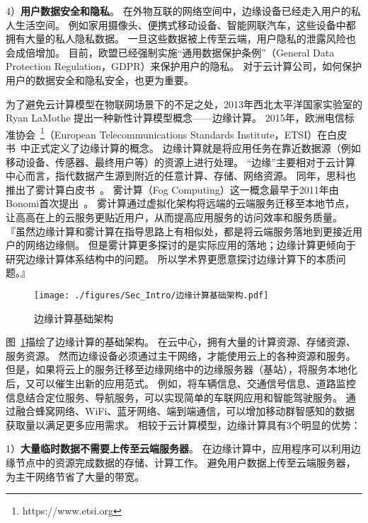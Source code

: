 4）\textbf{用户数据安全和隐私}。
在外物互联的网络空间中，边缘设备已经走入用户的私人生活空间。
例如家用摄像头、便携式移动设备、智能网联汽车，这些设备中都拥有大量的私人隐私数据。
一旦这些数据被上传至云端，用户隐私的泄露风险也会成倍增加。
目前，欧盟已经强制实施“通用数据保护条例”（General Data Protection Regulation，GDPR）来保护用户的隐私。
对于云计算公司，如何保护用户的数据安全和隐私安全，也更为重要。

为了避免云计算模型在物联网场景下的不足之处，2013年西北太平洋国家实验室的 Ryan LaMothe 提出一种新性计算模型概念——边缘计算。
2015年，欧洲电信标准协会~\footnote{https://www.etsi.org}（European Telecommunications Standards Institute，ETSI）在白皮书~\cite{hu2015mobile}中正式定义了边缘计算的概念。
边缘计算就是将应用任务在靠近数据源（例如移动设备、传感器、最终用户等）的资源上进行处理。
“边缘”主要相对于云计算中心而言，指代数据产生源到附近的任意计算、存储、网络资源。
同年，思科也推出了雾计算白皮书~\cite{computing2015internet}。
雾计算（Fog Computing）这一概念最早于2011年由Bonomi首次提出~\cite{bonomi2011connected}。
雾计算通过虚拟化架构将远端的云端服务迁移至本地节点，让高高在上的云服务更贴近用户，从而提高应用服务的访问效率和服务质量。
『虽然边缘计算和雾计算在指导思路上有相似处，都是将云端服务落地到更接近用户的网络边缘侧。
但是雾计算更多探讨的是实际应用的落地；边缘计算更倾向于研究边缘计算体系结构中的问题。
所以学术界更愿意探讨边缘计算下的本质问题。』

\begin{figure}[!h]
  \centering
  \texttt{[image: ./figures/Sec\_Intro/边缘计算基础架构.pdf]}
  \vspace{-0.5em}
  \caption{边缘计算基础架构}
  \label{Figure_EC_Architecture}
\end{figure}

图~\ref{Figure_EC_Architecture}描绘了边缘计算的基础架构。
在云中心，拥有大量的计算资源、存储资源、服务资源。
然而边缘设备必须通过主干网络，才能使用云上的各种资源和服务。
但是，如果将云上的服务迁移至边缘网络中的边缘服务器（基站），将服务本地化后，又可以催生出新的应用范式。
例如，将车辆信息、交通信号信息、道路监控信息结合定位服务、导航服务，可以实现简单的车联网应用和智能驾驶服务。
通过融合蜂窝网络、WiFi、蓝牙网络、端到端通信，可以增加移动群智感知的数据获取量以满足更多应用需求。
相较于云计算模型，边缘计算具有3个明显的优势：

1）\textbf{大量临时数据不需要上传至云端服务器}。
在边缘计算中，应用程序可以利用边缘节点中的资源完成数据的存储、计算工作。
避免用户数据上传至云端服务器，为主干网络节省了大量的带宽。

